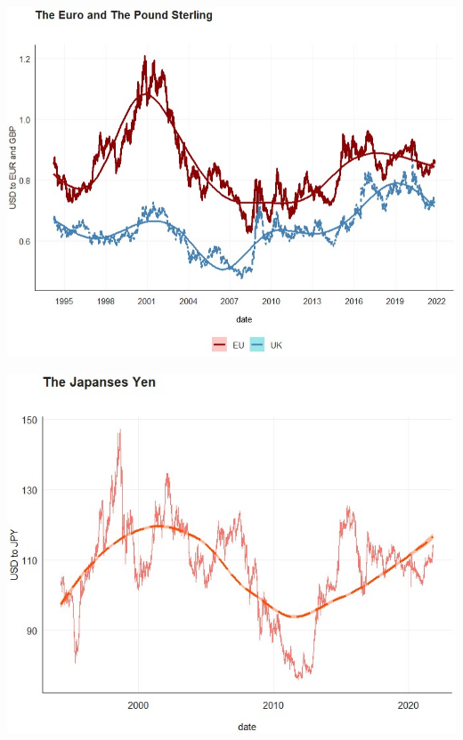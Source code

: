 \documentclass[11pt,preprint, authoryear]{elsarticle}
\let\origfigure\figure
\let\endorigfigure\endfigure
\renewenvironment{figure}[1][2] {
    \expandafter\origfigure\expandafter[H]
} {
    \endorigfigure
}
\numberwithin{equation}{section}
\numberwithin{figure}{section}
\numberwithin{table}{section}
\begin{document}
\begin{figure}
\centering 
\begin{minipage}[t]{8.2cm} 
\centering 
 \includegraphics[width=\linewidth]{for1.jpg} 
 \end{minipage} 
 \hspace{0.1cm} 
 \begin{minipage}[t]{8.2cm} 
 \centering 
 \includegraphics[width=\linewidth]{for2.jpg} 
 \end{minipage}
\caption{caption}
\label{for}
\end{figure}
\end{document}
